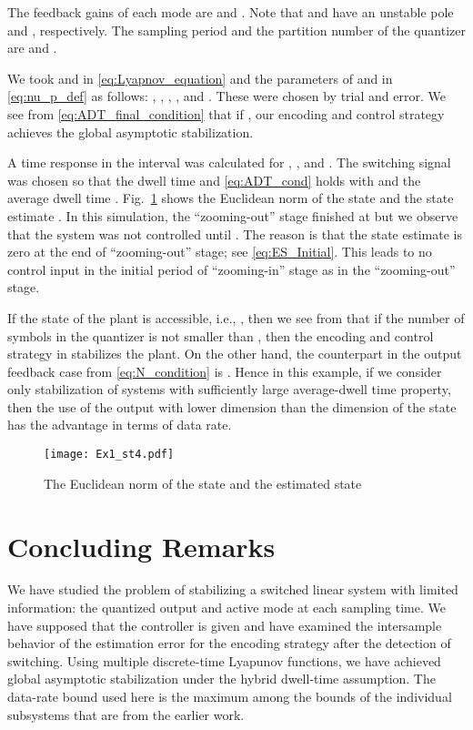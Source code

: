 \documentclass[letterpaper, 11pt, onecolumn]{ieeeconf}  \IEEEoverridecommandlockouts
\begin{document}
The feedback gains of each mode are
 and .
Note that  and 
have an unstable pole  and ,
respectively.
The sampling period  and
the partition number  of the quantizer are
 and .

We took  and  in \eqref{eq:Lyapnov_equation} and
the parameters of  and  in \eqref{eq:nu_p_def}
as follows: 
, 
, , 
, and . These were chosen by
trial and error.
We see from \eqref{eq:ADT_final_condition} that
if , our encoding and control strategy
achieves the global asymptotic stabilization.

A time response in the interval  was calculated for
, , and .
The switching signal was chosen so that 
the dwell time  and
\eqref{eq:ADT_cond}
holds with  and the average dwell time .
Fig.~\ref{fig:simulation}
shows the Euclidean norm of
the state  and the state estimate . 
In this simulation, the ``zooming-out'' stage finished at  but we observe that 
the system was not controlled until . The reason is that
the state estimate is zero at the end of ``zooming-out'' stage; see \eqref{eq:ES_Initial}.
This leads to no control input in
the initial period of ``zooming-in'' stage as in
the ``zooming-out'' stage.

If the state of the plant is accessible, i.e., , then we see from 
\cite[Assumption 3]{Liberzon2014} that if the number of symbols in the 
quantizer is not smaller than , then 
the encoding and control strategy in \cite{Liberzon2014}
stabilizes the plant.
On the other hand, the counterpart in the output feedback case from
\eqref{eq:N_condition} is .
Hence in this example, if we consider only stabilization
of systems with sufficiently large average-dwell time property, then 
the use of the output with lower dimension than the dimension of the state
has the advantage in terms of data rate.
 \begin{figure}[t]
 \centering
 \texttt{[image: Ex1\_st4.pdf]}
 \caption{The Euclidean norm of the state  and the estimated state }
 \label{fig:simulation}
 \end{figure}




\section{Concluding Remarks}
We have studied the problem of stabilizing 
a switched linear system with limited information: 
the quantized output and active mode at each sampling time.
We have supposed that the controller is given
and have examined the intersample behavior of the estimation error
for the encoding strategy after the detection of switching.
Using multiple discrete-time Lyapunov functions, we have achieved
global asymptotic stabilization under
the hybrid dwell-time assumption.
The data-rate bound used here is
the maximum among the bounds of the individual subsystems
that are from the earlier work. 
\end{document}
